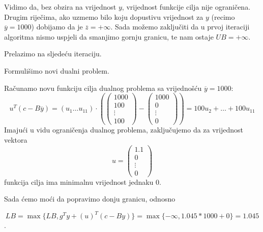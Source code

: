 \documentclass[a4paper, utf8, 11pt, colorlinks]{book}
\begin{document}
Vidimo da, bez obzira na vrijednost $y$, vrijednost funkcije cilja nije ograničena.
Drugim riječima, ako uzmemo bilo koju dopustivu vrijednost za $y$ (recimo $\overline{y}=1000$) dobijamo da je $\overline{z} = +\infty$. Sada možemo zaključiti da u prvoj iteraciji algoritma nismo uspjeli da smanjimo gornju granicu, te nam ostaje $UB = +\infty$.

 Prelazimo na sljedeću iteraciju.
 
 Formulišimo novi dualni problem.
 
  Računamo novu funkciju cilja dualnog problema sa vrijednošću $\overline{y}=1000$:
 $$
 u^T (c-B\overline{y})=(u_1\ldots u_{11})\cdot \left(\left(\begin{array}{c}
 	1000 \\
 	100 \\
 	\vdots \\
 	100
 \end{array}\right)-\left(\begin{array}{c}
 	1000 \\
 	0 \\
 	\vdots \\
 	0
 \end{array}\right)\right) = 100u_2+\ldots+100u_{11}
 $$
 Imajući u vidu ograničenja dualnog problema, zaključujemo da za vrijednost vektora $$u=\left(\begin{array}{c}
 	1.1 \\
 	0 \\
 	\vdots \\
 	0
 \end{array}\right)$$
funkcija cilja ima minimalnu vrijednost jednaku 0.

Sada ćemo moći da popravimo donju granicu, odnosno

$$LB = \max\{LB,g^Ty+(u)^T(c-By)\}=\max\{-\infty,1.045*1000+0\} = 1.045$$.
\end{document}
